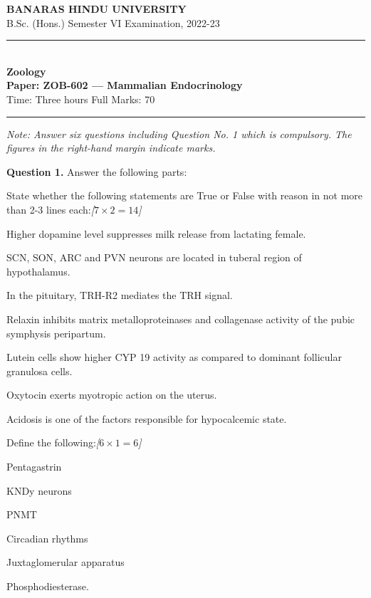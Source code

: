 \documentclass[11pt,a4paper]{article}
\newcommand{\pts}[1]{\hfill   \textit{[#1]}}
\begin{document}
\begin{center}
  {\large\bfseries BANARAS HINDU UNIVERSITY}\\[2pt]
  {\normalsize B.Sc. (Hons.) Semester VI Examination, 2022-23}\\[6pt]
  \rule{0.8\linewidth}{0.5pt}\\[6pt]
  {\large\bfseries Zoology}\\[4pt]
  {\large\bfseries Paper: ZOB-602 --- Mammalian Endocrinology}\\[4pt]
  {\normalsize Time: Three hours \hfill Full Marks: 70}
\end{center}

\rule{\linewidth}{0.4pt}

\smallskip



\noindent   \textit{Note: Answer six questions including Question No. 1 which is compulsory. The figures in the right-hand margin indicate marks.}

\bigskip




\noindent   \textbf{Question 1.} Answer the following parts:

\begin{parts}
  \item State whether the following statements are True or False with reason in not more than 2-3 lines each:\pts{$7  \times 2 = 14$}
  
\begin{parts}
    \item Higher dopamine level suppresses milk release from lactating female.
    \item SCN, SON, ARC and PVN neurons are located in tuberal region of hypothalamus.
    \item In the pituitary, TRH-R2 mediates the TRH signal.
    \item Relaxin inhibits matrix metalloproteinases and collagenase activity of the pubic symphysis peripartum.
    \item Lutein cells show higher CYP 19 activity as compared to dominant follicular granulosa cells.
    \item Oxytocin exerts myotropic action on the uterus.
    \item Acidosis is one of the factors responsible for hypocalcemic state.
  \end{parts}
  
  \item Define the following:\pts{$6  \times 1 = 6$}
  
\begin{parts}
    \item Pentagastrin
    \item KNDy neurons
    \item PNMT
    \item Circadian rhythms
    \item Juxtaglomerular apparatus
    \item Phosphodiesterase.
  \end{parts}
\end{parts}
\end{document}
